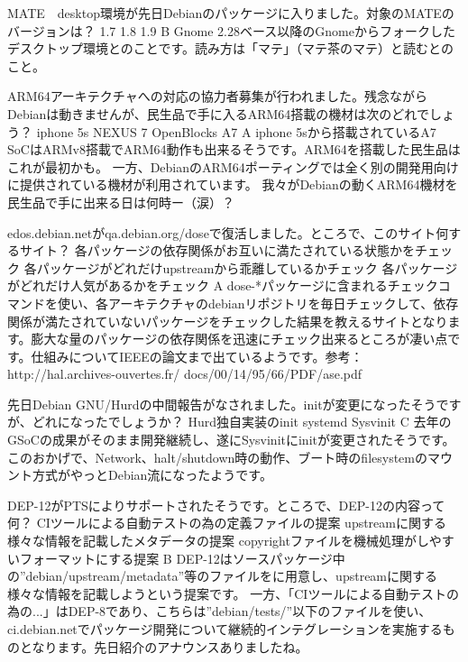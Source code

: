 %

\santaku
{MATE　desktop環境が先日Debianのパッケージに入りました。対象のMATEのバージョンは？}
{1.7}
{1.8}
{1.9}
{B}
{Gnome 2.28ベース以降のGnomeからフォークしたデスクトップ環境とのことです。読み方は「マテ」（マテ茶のマテ）と読むとのこと。}

\santaku
{ARM64アーキテクチャへの対応の協力者募集が行われました。残念ながらDebianは動きませんが、民生品で手に入るARM64搭載の機材は次のどれでしょう？}
{iphone 5s}
{NEXUS 7}
{OpenBlocks A7}
{A}
{iphone 5sから搭載されているA7 SoCはARMv8搭載でARM64動作も出来るそうです。ARM64を搭載した民生品はこれが最初かも。
一方、DebianのARM64ポーティングでは全く別の開発用向けに提供されている機材が利用されています。
我々がDebianの動くARM64機材を民生品で手に出来る日は何時ー（涙）？}

\santaku
{edos.debian.netがqa.debian.org/doseで復活しました。ところで、このサイト何するサイト？}
{各パッケージの依存関係がお互いに満たされている状態かをチェック}
{各パッケージがどれだけupstreamから乖離しているかチェック}
{各パッケージがどれだけ人気があるかをチェック}
{A}
{dose-*パッケージに含まれるチェックコマンドを使い、各アーキテクチャのdebianリポジトリを毎日チェックして、依存関係が満たされていないパッケージをチェックした結果を教えるサイトとなります。膨大な量のパッケージの依存関係を迅速にチェック出来るところが凄い点です。仕組みについてIEEEの論文まで出ているようです。参考：http://hal.archives-ouvertes.fr/ docs/00/14/95/66/PDF/ase.pdf}

\santaku
{先日Debian GNU/Hurdの中間報告がなされました。initが変更になったそうですが、どれになったでしょうか？}
{Hurd独自実装のinit}
{systemd}
{Sysvinit}
{C}
{去年のGSoCの成果がそのまま開発継続し、遂にSysvinitにinitが変更されたそうです。このおかげで、Network、halt/shutdown時の動作、ブート時のfilesystemのマウント方式がやっとDebian流になったようです。}

\santaku
{DEP-12がPTSによりサポートされたそうです。ところで、DEP-12の内容って何？}
{CIツールによる自動テストの為の定義ファイルの提案}
{upstreamに関する様々な情報を記載したメタデータの提案}
{copyrightファイルを機械処理がしやすいフォーマットにする提案}
{B}
{DEP-12はソースパッケージ中の''debian/upstream/metadata''等のファイルをに用意し、upstreamに関する様々な情報を記載しようという提案です。
 一方、「CIツールによる自動テストの為の...」はDEP-8であり、こちらは''debian/tests/''以下のファイルを使い、ci.debian.netでパッケージ開発について継続的インテグレーションを実施するものとなります。先日紹介のアナウンスありましたね。}

